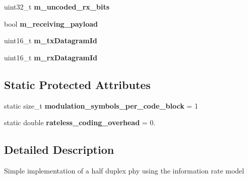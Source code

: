 \begin{DoxyCompactItemize}
\item 
\hypertarget{classns3_1_1PLC__InformationRatePhy_a49a4e41948f9c487788dfcfcb85b0aba}{uint32\-\_\-t {\bfseries m\-\_\-uncoded\-\_\-rx\-\_\-bits}}\label{classns3_1_1PLC__InformationRatePhy_a49a4e41948f9c487788dfcfcb85b0aba}

\item 
\hypertarget{classns3_1_1PLC__InformationRatePhy_a104f48ec41c96748fc9a4bc4880b7881}{bool {\bfseries m\-\_\-receiving\-\_\-payload}}\label{classns3_1_1PLC__InformationRatePhy_a104f48ec41c96748fc9a4bc4880b7881}

\item 
\hypertarget{classns3_1_1PLC__InformationRatePhy_a8148780bac87d3fd054444b8c77f1408}{uint16\-\_\-t {\bfseries m\-\_\-tx\-Datagram\-Id}}\label{classns3_1_1PLC__InformationRatePhy_a8148780bac87d3fd054444b8c77f1408}

\item 
\hypertarget{classns3_1_1PLC__InformationRatePhy_ab8cf71a701c88b0feed2831a5b1b7f55}{uint16\-\_\-t {\bfseries m\-\_\-rx\-Datagram\-Id}}\label{classns3_1_1PLC__InformationRatePhy_ab8cf71a701c88b0feed2831a5b1b7f55}

\end{DoxyCompactItemize}
\subsection*{\-Static \-Protected \-Attributes}
\begin{DoxyCompactItemize}
\item 
\hypertarget{classns3_1_1PLC__InformationRatePhy_ad811605437ed7f79b619b9f74244aeb9}{static size\-\_\-t {\bfseries modulation\-\_\-symbols\-\_\-per\-\_\-code\-\_\-block} = 1}\label{classns3_1_1PLC__InformationRatePhy_ad811605437ed7f79b619b9f74244aeb9}

\item 
\hypertarget{classns3_1_1PLC__InformationRatePhy_aa276a1823fbce02d8a7c3ccbeed904f0}{static double {\bfseries rateless\-\_\-coding\-\_\-overhead} = 0.}\label{classns3_1_1PLC__InformationRatePhy_aa276a1823fbce02d8a7c3ccbeed904f0}

\end{DoxyCompactItemize}


\subsection{\-Detailed \-Description}
\-Simple implementation of a half duplex phy using the information rate model 

